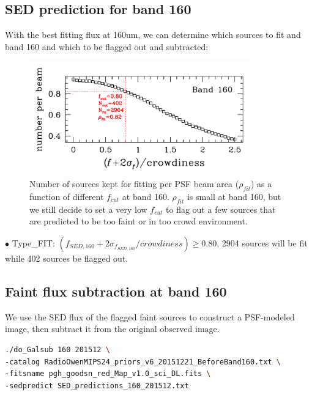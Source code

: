 \documentclass[11pt,a4paper]{article}
\begin{document}
\subsection{SED prediction for band 160}
\label{Band160_Galpre}

With the best fitting flux at 160um, we can determine which sources to fit and band 160 and which to be flagged out and subtracted: 

\begin{figure}[H]
	\caption{Number of sources kept for fitting per PSF beam area ($\rho_{fit}$) as a function of different $f_{cut}$ at band 160. $\rho_{fit}$ is small at band 160, but we still decide to set a very low $f_{cut}$ to flag out a few sources that are predicted to be too faint or in too crowd environment.}
	\includegraphics[width=0.85\textwidth]{plot_cutting_flux_160_with_crow}
\end{figure}

\indent\hspace{15pt}$\bullet$ 
Type\_FIT: $(f_{SED,160}+2\sigma_{f_{SED,160}}/crowdiness) \ge 0.80$, 2904 sources will be fit while 402 sources be flagged out. 
\\

\subsection{Faint flux subtraction at band 160}
\label{Band160_Galsub}

We use the SED flux of the flagged faint sources to construct a PSF-modeled image, then subtract it from the original observed image. 

\begin{lstlisting}[language=bash]
./do_Galsub 160 201512 \
-catalog RadioOwenMIPS24_priors_v6_20151221_BeforeBand160.txt \
-fitsname pgh_goodsn_red_Map_v1.0_sci_DL.fits \
-sedpredict SED_predictions_160_201512.txt
\end{lstlisting}
\end{document}
